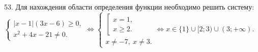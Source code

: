 53. Для нахождения области определения функции необходимо решить систему:\\ $\begin{cases} |x-1|(3x-6)\geqslant0,\\ x^2+4x-21\neq0.\end{cases}\Leftrightarrow
\begin{cases} \left[\begin{array}{l} x=1,\\ x\geqslant2.\end{array}\right.\\ x\neq-7,\ x\neq3.\end{cases}\Leftrightarrow x\in \{1\}\cup[2;3)\cup(3;+\infty).$\\
